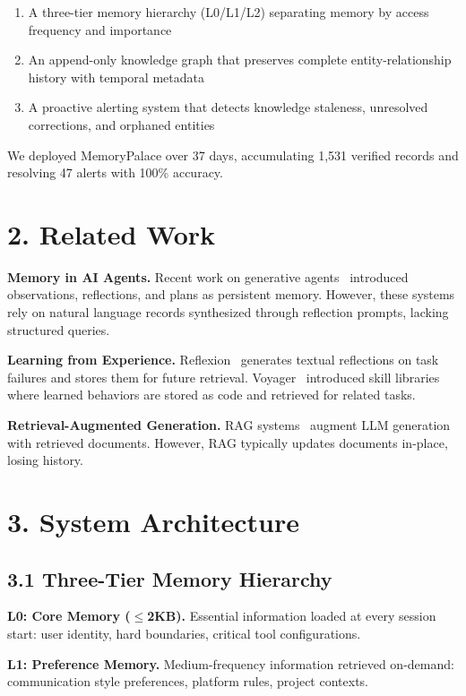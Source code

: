 \documentclass[11pt,a4paper]{article}
\begin{document}
\begin{enumerate}
\item A three-tier memory hierarchy (L0/L1/L2) separating memory by access frequency and importance
\item An append-only knowledge graph that preserves complete entity-relationship history with temporal metadata
\item A proactive alerting system that detects knowledge staleness, unresolved corrections, and orphaned entities
\end{enumerate}

We deployed MemoryPalace over 37 days, accumulating 1,531 verified records and resolving 47 alerts with 100\% accuracy.

\section{2. Related Work}

\textbf{Memory in AI Agents.} Recent work on generative agents~\cite{park2023generative} introduced observations, reflections, and plans as persistent memory. However, these systems rely on natural language records synthesized through reflection prompts, lacking structured queries.

\textbf{Learning from Experience.} Reflexion~\cite{shinn2023reflexion} generates textual reflections on task failures and stores them for future retrieval. Voyager~\cite{wang2023voyager} introduced skill libraries where learned behaviors are stored as code and retrieved for related tasks.

\textbf{Retrieval-Augmented Generation.} RAG systems~\cite{lewis2020rag} augment LLM generation with retrieved documents. However, RAG typically updates documents in-place, losing history.

\section{3. System Architecture}

\subsection{3.1 Three-Tier Memory Hierarchy}

\textbf{L0: Core Memory ($\leq$2KB).} Essential information loaded at every session start: user identity, hard boundaries, critical tool configurations.

\textbf{L1: Preference Memory.} Medium-frequency information retrieved on-demand: communication style preferences, platform rules, project contexts.
\end{document}
